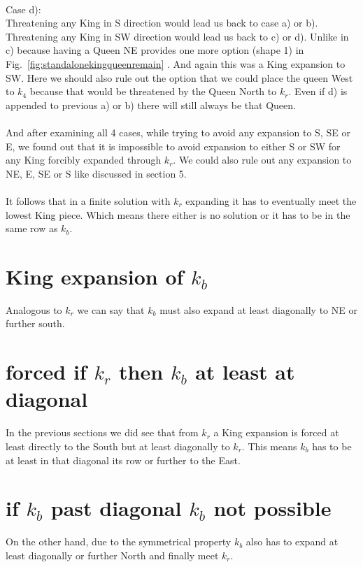 \documentclass[a4paper,oneside]{scrarticle}
\begin{document}
	\\
	Case d):\\
	Threatening any King in S direction would lead us back to case a) or b). Threatening any King in SW direction would lead us back to c) or d). Unlike in c) because having a Queen NE provides one more option (shape 1) in Fig.~\ref{fig:standalonekingqueenremain} . And again this was a King expansion to SW. Here we should also rule out the option that we could place the queen West to $k_4$ because that would be threatened by the Queen North to $k_r$. Even if d) is appended to previous a) or b) there will still always be that Queen.
	\\
	\\
	And after examining all 4 cases, while trying to avoid any expansion to S, SE or E, we found out that it is impossible to avoid expansion to either S or SW for any King forcibly expanded through $k_r$. We could also rule out any expansion to NE, E, SE or S like discussed in section 5.\\
	\\
	It follows that in a finite solution with $k_r$ expanding it has to eventually meet the lowest King piece. Which means there either is no solution or it has to be in the same row as $k_b$.
	
	\section{King expansion of $k_b$}
	Analogous to $k_r$ we can say that $k_b$ must also expand at least diagonally to NE or further south.
	
	\section{forced if $k_r$ then $k_b$ at least at diagonal}
	In the previous sections we did see that from $k_r$ a King expansion is forced at least directly to the South but at least diagonally to $k_r$. This means $k_b$ has to be at least in that diagonal its row or further to the East. 
	
	\section{if $k_b$ past diagonal $k_b$ not possible}
	On the other hand, due to the symmetrical property $k_b$ also has to expand at least diagonally or further North and finally meet $k_r$.
	
\end{document}
